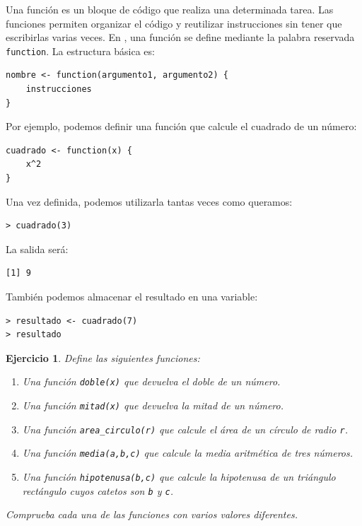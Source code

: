 \documentclass[11pt,a4paper]{article}
\newcommand{\R}{\textcolor{azuluc}{\faIcon{r-project}}}
\theoremstyle{exercise}
\newtheorem{exercise}{Ejercicio}
\begin{document}
Una función es un bloque de código que realiza una determinada tarea. Las funciones permiten organizar el código y reutilizar instrucciones sin tener que escribirlas varias veces. En \R, una función se define mediante la palabra reservada \texttt{function}.
La estructura básica es:

\begin{lstlisting}[style=rstyle]
nombre <- function(argumento1, argumento2) {
	instrucciones
}
\end{lstlisting}

\noindent Por ejemplo, podemos definir una función que calcule el cuadrado de un número:

\begin{lstlisting}[style=rstyle]
cuadrado <- function(x) {
	x^2
}
\end{lstlisting}

\noindent Una vez definida, podemos utilizarla tantas veces como queramos:

\begin{lstlisting}[style=rconsole]
> cuadrado(3)
\end{lstlisting}

\noindent La salida será:

\begin{lstlisting}[style=routput]
[1] 9
\end{lstlisting}

\noindent También podemos almacenar el resultado en una variable:

\begin{lstlisting}[style=rconsole]
> resultado <- cuadrado(7)
> resultado
\end{lstlisting}

\begin{exercise}
Define las siguientes funciones:

\begin{enumerate}[label=\alph*)]
  \item Una función \texttt{doble(x)} que devuelva el doble de un número.
  \item Una función \texttt{mitad(x)} que devuelva la mitad de un número.
  \item Una función \texttt{area\_circulo(r)} que calcule el área de un círculo de radio \texttt{r}.
  \item Una función \texttt{media(a,b,c)} que calcule la media aritmética de tres números.
  \item Una función \texttt{hipotenusa(b,c)} que calcule la hipotenusa de un triángulo rectángulo cuyos catetos son \texttt{b} y \texttt{c}.
\end{enumerate}

\noindent Comprueba cada una de las funciones con varios valores diferentes.
\end{exercise}
\end{document}
